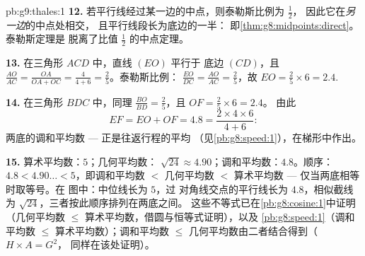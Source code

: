 \begin{solution}{pb:g9:thales:1}
\textbf{12.} 若平行线经过某一边的中点，则泰勒斯比例为 $\frac12$，
因此它在\emph{另一边}的中点处相交，
且平行线段长为底边的一半：
即\cref{thm:g8:midpoints:direct}。泰勒斯定理是
脱离了比值 $\frac12$ 的中点定理。

\textbf{13.} 在三角形 $ACD$ 中，直线 $(EO)$ 平行于
底边 $(CD)$，且 $\frac{AO}{AC} = \frac{OA}{OA + OC} =
\frac{4}{4 + 6} = \frac25$。泰勒斯比例：
$\frac{EO}{DC} = \frac{AO}{AC} = \frac25$，故
$EO = \frac25 \times 6 = 2.4$.

\textbf{14.} 在三角形 $BDC$ 中，同理
$\frac{BO}{BD} = \frac25$，且 $OF = \frac25 \times 6 = 2.4$。
由此
\[
EF = EO + OF = 4.8
= \frac{2 \times 4 \times 6}{4 + 6} :
\]
两底的调和平均数 --- 正是往返行程的平均
（见\cref{pb:g8:speed:1}），在梯形中作出。

\textbf{15.} 算术平均数：$5$；几何平均数：
$\sqrt{24} \approx 4.90$；调和平均数：$4.8$。顺序：
$4.8 < 4.90\ldots < 5$，即调和平均数 $<$ 几何平均数 $<$
算术平均数 --- 仅当两底相等时取等号。在
图中：中位线长为 $5$，过
对角线交点的平行线长为 $4.8$，相似截线
为 $\sqrt{24}$，三者按此顺序排列在两底之间。
这些不等式已在\cref{pb:g8:cosine:1}中证明（几何平均数
$\leq$ 算术平均数，借圆与恒等式证明），以及
\cref{pb:g8:speed:1}（调和平均数 $\leq$ 算术平均数）；调和平均数
$\leq$ 几何平均数由二者结合得到（$H \times A = G^2$，
同样在该处证明）。
\end{solution}

